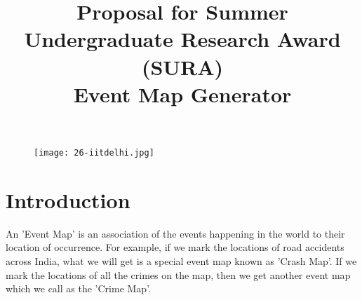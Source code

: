 \documentclass[a4paper,11pt]{article}
\title{Proposal for Summer Undergraduate Research Award (SURA) \\ \textbf{Event Map Generator}}
\author{
}\date{}
\begin{document}
\begin{figure}[t]
\centering
\texttt{[image: 26-iitdelhi.jpg]}
\end{figure}

\maketitle
\begin{multicols}{2}

\end{multicols}

\vspace{60pt}


\begin{multicols}{2}
\end{multicols}
    
\newpage

\section{Introduction}

An 'Event Map' is an association of the events happening in the world to their location of occurrence. For example, if we mark the locations of road accidents across India, what we will get is a special event map known as 'Crash Map'. If we mark the locations of all the crimes on the map, then we get another event map which we call as the 'Crime Map'.
\end{document}
